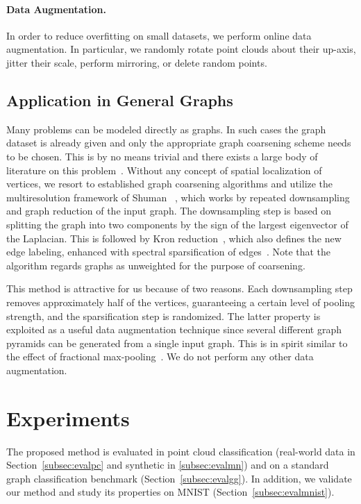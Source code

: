 \documentclass[10pt,twocolumn,letterpaper]{article}
\begin{document}
\paragraph*{Data Augmentation.} In order to reduce overfitting on small datasets, we perform online data augmentation. In particular, we randomly rotate point clouds about their up-axis, jitter their scale, perform mirroring, or delete random points.


\subsection{Application in General Graphs} \label{subsec:applgraphs}


Many problems can be modeled directly as graphs. In such cases the graph dataset is already given and only the appropriate graph coarsening scheme needs to be chosen. This is by no means trivial and there exists a large body of literature on this problem~\cite{safro14}. Without any concept of spatial localization of vertices, we resort to established graph coarsening algorithms and utilize the multiresolution framework of Shuman \etal~\cite{shumanFV16,gspbox}, which works by repeated downsampling and graph reduction of the input graph. The downsampling step is based on splitting the graph into two components by the sign of the largest eigenvector of the Laplacian. This is followed by Kron reduction~\cite{kron}, which also defines the new edge labeling, enhanced with spectral sparsification of edges~\cite{spielman2011graph}. Note that the algorithm regards graphs as unweighted for the purpose of coarsening.

This method is attractive for us because of two reasons. Each downsampling step removes approximately half of the vertices, guaranteeing a certain level of pooling strength, and the sparsification step is randomized. The latter property is exploited as a useful data augmentation technique since several different graph pyramids can be generated from a single input graph. This is in spirit similar to the effect of fractional max-pooling~\cite{fractpool}. We do not perform any other data augmentation.


\section{Experiments}

The proposed method is evaluated in point cloud classification (real-world data in Section~\ref{subsec:evalpc} and synthetic in \ref{subsec:evalmn}) and on a standard graph classification benchmark (Section~\ref{subsec:evalgg}). In addition, we validate our method and study its properties on MNIST (Section~\ref{subsec:evalmnist}).
\end{document}
